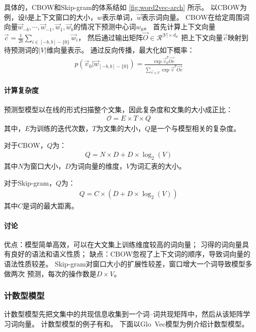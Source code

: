 具体的，CBOW和Skip-gram的体系结如 \cref{fig:word2vec-arch} 所示。
以CBOW为例，设$b$是上下文窗口的大小，$w$表示单词，$\vec{w}$表示词向量。
CBOW在给定周围词向量$\vec{w}_{-b}, \cdots, \vec{w}_{-1}, \vec{w}_1, \vec{w}_b$的情况下预测中心词$w_0$。
首先计算上下文向量$\vec{c} = \frac{1}{2b} \sum_{i \in [-b,b]-\{0\}}\vec{w}_i$，
然后通过输出矩阵$\vec{O} \in \mathcal{R}^{|V|\times d_w}$
把上下文向量$\vec{c}$映射到待预测词的$|V|$维向量表示。
通过反向传播，最大化如下概率：
\begin{align}
  p(\vec{v}_0|\vec{w}_{[-b,b]-\{0\}}) = \frac{\exp \vec{v}_0^T \vec{Oc}}{\sum_{\vec{v} \in V} \exp \vec{v}^T \vec{Oc}}
\end{align}

\paragraph{计算复杂度}
预测型模型以在线的形式扫描整个文集，因此复杂度和文集的大小成正比：
\begin{align}
  \mathcal{O} = E \times T \times Q
  \label{eqn:predict-based-complexity}
\end{align}
其中，$E$为训练的迭代次数，$T$为文集的大小，$Q$是一个与模型相关的复杂度。

对于CBOW，$Q$为：
\begin{align}
  Q = N \times D + D \times \log_2(V)
  \label{eqn:cbow-complexity}
\end{align}
其中$N$为窗口大小，$D$为词向量的维度，$V$为词汇表的大小。

对于Skip-gram，$Q$为：
\begin{align}
  Q = C \times (D + D \times \log_2(V))
  \label{eqn:skip-gram-complexity}
\end{align}
其中$C$是词的最大距离。

\paragraph{讨论}
优点：模型简单高效，可以在大文集上训练维度较高的词向量；
习得的词向量具有良好的语法和语义性质；
缺点：CBOW忽视了上下文词的顺序，导致词向量的语法性质较差。
Skip-gram对窗口大小的扩展性较差，窗口增大一个词导致模型多做两次
预测，每次的操作数是$D \times V$\cite{DBLP:conf/emnlp/LingTAFDBTL15}。

\subsubsection{计数型模型}
计数型模型先把文集中的共现信息收集到一个词--词共现矩阵中，然后从该矩阵学习词向量。
计数型模型的例子有\cite{DBLP:journals/jasis/DeerwesterDLFH90}和\cite{pennington2014glove}。
下面以Glo~Vec模型为例介绍计数型模型。

